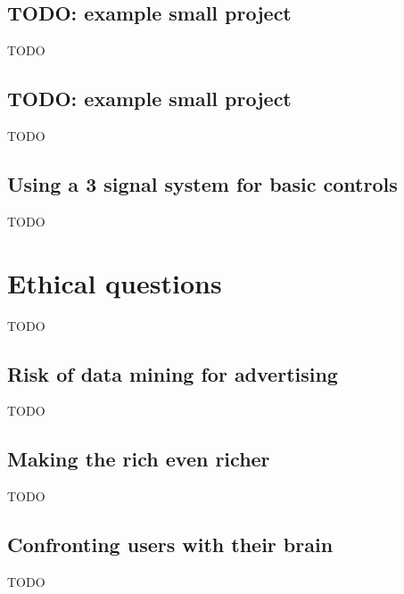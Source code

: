 \subsection{TODO: example small project}
\label{subsec:introduction_small_projects_XXX}
TODO

\subsection{TODO: example small project}
\label{subsec:introduction_small_projects_YYY}
TODO

\subsection{Using a 3 signal system for basic controls}
\label{subsec:introduction_small_projects_ours}
TODO

\section{Ethical questions}
\label{sec:introduction_ethical}
TODO

\subsection{Risk of data mining for advertising}
\label{subsec:introduction_ethical_ads}
TODO

\subsection{Making the rich even richer}
\label{subsec:introduction_ethical_expensive}
TODO

\subsection{Confronting users with their brain}
\label{subsec:introduction_ethical_medical_users}
TODO